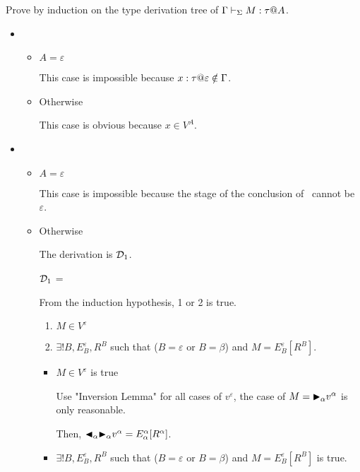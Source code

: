 Prove by induction on the type derivation tree of $\G \V M:\tau@A$.

\begin{itemize}
	\item \TVar
	      \begin{itemize}
		      \item $ A = \varepsilon$

		            This case is impossible because $x:\tau@\varepsilon \notin \G$.
		      \item Otherwise

		            This case is obvious because $x \in V^A$.
	      \end{itemize}

	\item \TTBL
	      \begin{itemize}
		      \item $ A = \varepsilon$

		            This case is impossible because the stage of the conclusion of \TTBL\ cannot be $\varepsilon$.

		      \item Otherwise

		            The derivation is $\mathcal{D}_1$.

		            $\mathcal{D}_1$ = 
		            {}

		            From the induction hypothesis, 1 or 2 is true.
		            \begin{enumerate}
			            \item $ M \in V^\varepsilon$
			            \item $\exists ! B, E^\varepsilon_B, R^B$ such that ($B = \varepsilon$ or $B = \beta$) and $M = E^\varepsilon_B[R^B]$.
		            \end{enumerate}

		            \begin{itemize}
			            \item $ M \in V^\varepsilon$ is true

			                  Use "Inversion Lemma" for all cases of $v^\varepsilon$, the case of $ M = {\mathop{\blacktriangleright}}_\alpha v^\alpha $ is only reasonable.

			                  Then, ${\mathop{\blacktriangleleft}}_\alpha {\mathop{\blacktriangleright}}_\alpha v^\alpha = E^\alpha_\alpha [R^\alpha]$.

			            \item $\exists ! B, E^\varepsilon_B, R^B$ such that ($B = \varepsilon$ or $B = \beta$) and $M = E^\varepsilon_B[R^B]$ is true.


\end{itemize}
\end{itemize}
\end{itemize}
